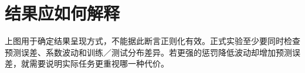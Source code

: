 \documentclass[UTF8,a4paper,11pt,fontset=fandol]{ctexart}
\begin{document}
\section{结果应如何解释}
上图用于确定结果呈现方式，不能据此断言正则化有效。正式实验至少要同时检查预测误差、系数波动和训练／测试分布差异。若更强的惩罚降低波动却增加预测误差，就需要说明实际任务更重视哪一种代价。

\end{document}
